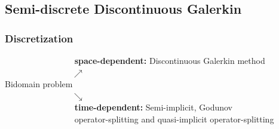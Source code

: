 \documentclass[9pt]{beamer}
\begin{document}
\begin{frame}
	\section{Semi-discrete Discontinuous Galerkin}
	\frametitle{Discretization}
	$\qquad \qquad \qquad \qquad $ \textbf{space-dependent:} Discontinuous Galerkin method\\\vspace{2mm}
	$\qquad \qquad \qquad \qquad \nearrow$\\
	Bidomain problem\\
	$\qquad \qquad \qquad \qquad \searrow$\\\vspace{2mm}
	$\qquad \qquad \qquad \qquad $ \textbf{time-dependent:} Semi-implicit, Godunov\\ $\qquad \qquad \qquad \qquad $ operator-splitting and quasi-implicit operator-splitting
\end{frame}
\end{document}
